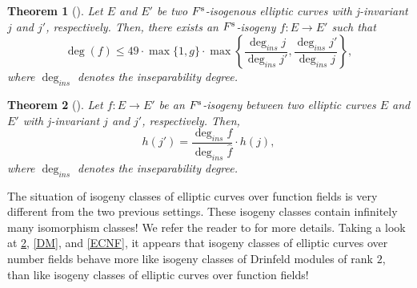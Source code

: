 \documentclass[11pt]{article}
\newtheorem{theorem}{Theorem}[section]
\theoremstyle{definition}
\renewcommand\leq{\leqslant}
\newcommand{\Fs}{F^{\text{\rm s}}}
\begin{document}
\begin{theorem}[]
    Let $ E $ and $ E'$ be two $\Fs$-isogenous elliptic curves with j-invariant $j$ and $j'$, respectively. Then, there exists an  $\Fs$-isogeny $f : E \rightarrow E'$ such that
    \[\deg(f)\leq 49 \cdot\max\{1,g\}\cdot\max\left\{\frac{\deg_{ins} j}{\deg_{ins}j'},\frac{\deg_{ins} j'}{\deg_{ins}j}\right\},\]
    where $\deg_{ins}$ denotes the inseparability degree.
\end{theorem}
\begin{theorem}[]\label{ECFF}
    Let $f : E \rightarrow E'$ be an $\Fs$-isogeny between two elliptic curves $E$ and $E'$ with j-invariant $j$ and $j'$, respectively. Then, 
    \[h(j')= \frac{\deg_{ins}f}{\deg_{ins}\hat{f}} \cdot h(j),\]
    where $\deg_{ins}$ denotes the inseparability degree.
\end{theorem}
\smallskip

The situation of isogeny classes of elliptic curves over function fields is very different from the two previous settings. These isogeny classes contain infinitely many isomorphism classes! We refer the reader to \cite{GP22} for more details. Taking a look at \cref{ECFF}, \cref{DM}, and \cref{ECNF}, it appears that isogeny classes of elliptic curves over number fields behave more like isogeny classes of Drinfeld modules of rank $2$, than like isogeny classes of elliptic curves over function fields!  
\end{document}
